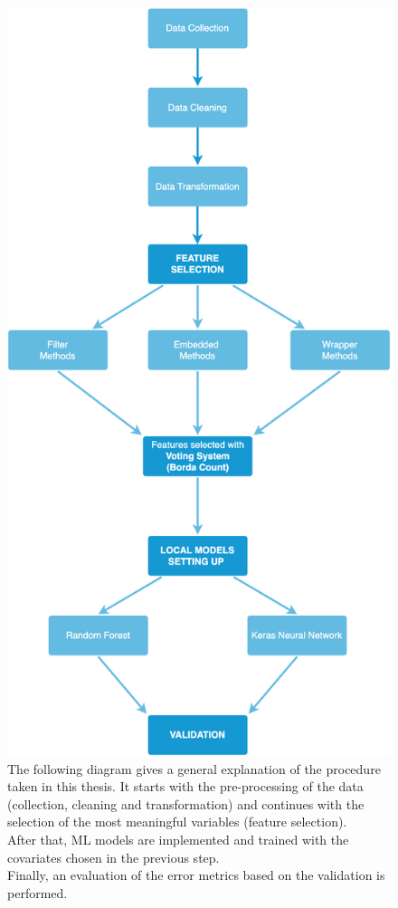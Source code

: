 \begin{figure}[H]
    \centering
    \includegraphics[scale=0.21]{images/overview.png}
    \caption{The following diagram gives a general explanation of the procedure taken in this thesis. It starts with the pre-processing of the data (collection, cleaning and transformation) and continues with the selection of the most meaningful variables (feature selection). \\
    After that, ML models are implemented and trained with the covariates chosen in the previous step. \\
    Finally, an evaluation of the error metrics based on the validation is performed.}
    \label{fig:overview}
\end{figure}


